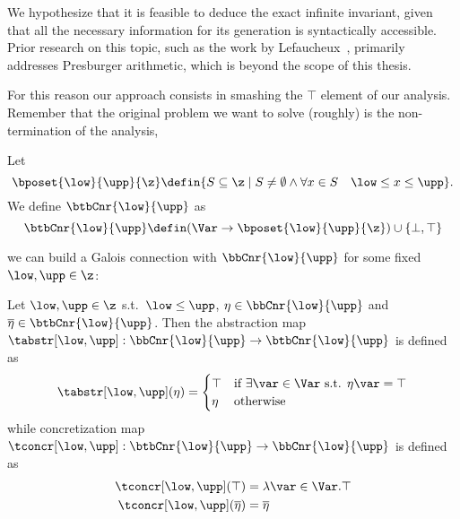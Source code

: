 We hypothesize that it is feasible to deduce the exact infinite
invariant, given that all the necessary information for its generation
is syntactically accessible. Prior research on this topic, such as the
work by Lefaucheux~\cite{Lefaucheux2024}, primarily addresses
Presburger arithmetic, which is beyond the scope of this thesis.

For this reason our approach consists in smashing the \(\top\) element
of our analysis. Remember that the original problem we want to solve
(roughly) is the non-termination of the analysis,


\begin{definition}
  Let
  \begin{equation*}
    \bposet{\low}{\upp}{\z} \defin \{S \subseteq \z \mid S \neq \emptyset \land \forall x \in S \quad \low \leq x \leq \upp\}.
  \end{equation*}
  We define \(\btbCnr{\low}{\upp}\) as
  \begin{equation*}
    \btbCnr{\low}{\upp} \defin (\Var \to \bposet{\low}{\upp}{\z}) \cup \{\bot, \top\}
  \end{equation*}
\end{definition}

we can build a Galois connection with \(\bbCnr{\low}{\upp}\) for some
fixed \(\low, \upp \in \z\):

\begin{definition}
  Let \(\low, \upp \in \z\) s.t.\ \(\low \leq \upp\),
  \(\eta \in \bbCnr{\low}{\upp}\) and
  \(\overline\eta \in \btbCnr{\low}{\upp}\). Then the abstraction map
  \({\tabstr[\low,\upp]} : \bbCnr{\low}{\upp} \to \btbCnr{\low}{\upp}\) is
  defined as
  \begin{equation*}
    {\tabstr[\low,\upp]}(\eta) = \begin{cases}
      \top & \text{if } \exists\var\in\Var \text{ s.t. } \eta\var = \top \\
      \eta & \text{otherwise}
    \end{cases}
  \end{equation*}
  while concretization map
  \({\tconcr[\low,\upp]} : \btbCnr{\low}{\upp} \to \bbCnr{\low}{\upp}\)
  is defined as
  \begin{align*}
    \tconcr[\low,\upp](\top) & = \lambda \var \in \Var . \top \\
    \tconcr[\low,\upp](\overline\eta) & = \overline\eta
  \end{align*}
\end{definition}

